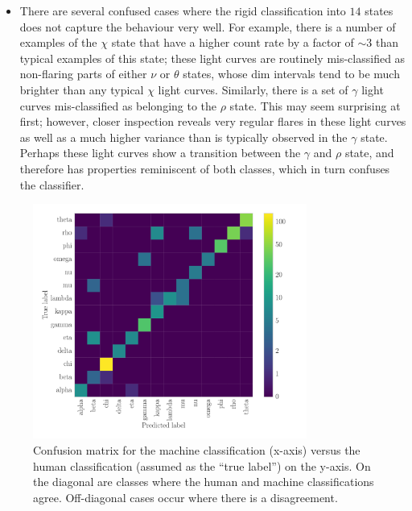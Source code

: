 \documentclass[fleqn,usenatbib]{mnras}
\begin{document}
\begin{itemize}
\item{There are several confused cases where the rigid classification into $14$ states does not capture the behaviour very well. For example, there is a number of examples of the $\chi$ state that have a higher count rate by a factor of $\sim 3$ than typical examples of this state; these light curves are routinely mis-classified as non-flaring parts of either $\nu$ or $\theta$ states, whose dim intervals tend to be much brighter than any typical $\chi$ light curves. Similarly, there is a set of $\gamma$ light curves mis-classified as belonging to the $\rho$ state. This may seem surprising at first; however, closer inspection reveals very regular flares in these light curves as well as a much higher variance than is typically observed in the $\gamma$ state. Perhaps these light curves show a transition between the $\gamma$ and $\rho$ state, and therefore has properties reminiscent of both classes, which in turn confuses the classifier.}
\end{itemize}

\begin{figure}
\begin{center}
\includegraphics[width=9cm]{grs1915_supervised_cm.pdf}
\caption{Confusion matrix for the machine classification (x-axis) versus the human classification (assumed as the ``true label'') on the 
y-axis. On the diagonal are classes where the human and machine classifications agree. Off-diagonal cases occur where there is a 
disagreement.} 
\label{fig:confusion_matrix}
\end{center}
\end{figure}
\end{document}
